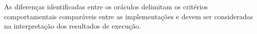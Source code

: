 As diferenças identificadas entre os oráculos delimitam os critérios comportamentais comparáveis entre as implementações e devem ser consideradas na interpretação dos resultados de execução.

